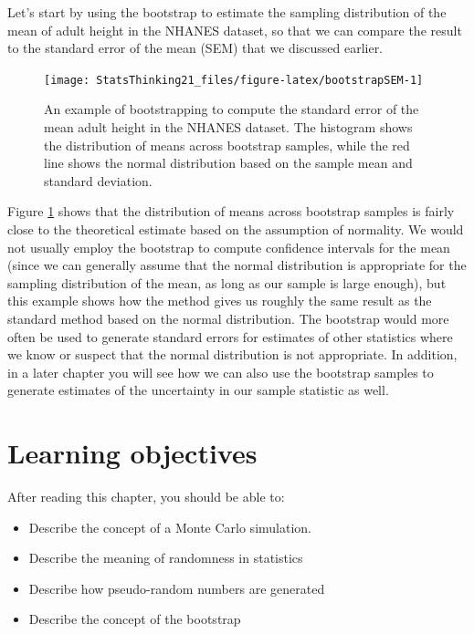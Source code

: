 \documentclass[
  12pt,
]{book}
\providecommand{\tightlist}{%
  \setlength{\itemsep}{0pt}\setlength{\parskip}{0pt}}
\begin{document}
Let's start by using the bootstrap to estimate the sampling distribution of the mean of adult height in the NHANES dataset, so that we can compare the result to the standard error of the mean (SEM) that we discussed earlier.

\begin{figure}
\texttt{[image: StatsThinking21\_files/figure-latex/bootstrapSEM-1]} \caption{An example of bootstrapping to compute the standard error of the mean adult height in the NHANES dataset. The histogram shows the distribution of means across bootstrap samples, while the red line shows the normal distribution based on the sample mean and standard deviation.}\label{fig:bootstrapSEM}
\end{figure}

Figure \ref{fig:bootstrapSEM} shows that the distribution of means across bootstrap samples is fairly close to the theoretical estimate based on the assumption of normality. We would not usually employ the bootstrap to compute confidence intervals for the mean (since we can generally assume that the normal distribution is appropriate for the sampling distribution of the mean, as long as our sample is large enough), but this example shows how the method gives us roughly the same result as the standard method based on the normal distribution. The bootstrap would more often be used to generate standard errors for estimates of other statistics where we know or suspect that the normal distribution is not appropriate. In addition, in a later chapter you will see how we can also use the bootstrap samples to generate estimates of the uncertainty in our sample statistic as well.

\hypertarget{learning-objectives-7}{%
\section{Learning objectives}\label{learning-objectives-7}}

After reading this chapter, you should be able to:

\begin{itemize}
\tightlist
\item
  Describe the concept of a Monte Carlo simulation.
\item
  Describe the meaning of randomness in statistics
\item
  Describe how pseudo-random numbers are generated
\item
  Describe the concept of the bootstrap
\end{itemize}
\end{document}
